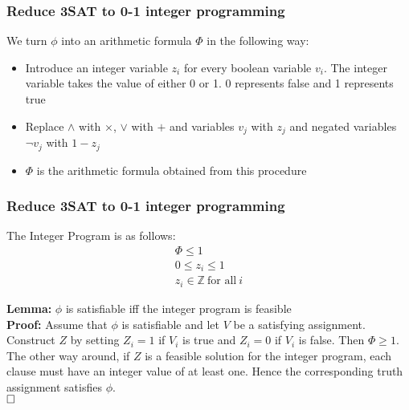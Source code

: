 \documentclass[mathserif]{beamer}
\renewcommand{\qed}{\hfill\square}
\begin{document}
\begin{frame}
\frametitle{Reduce 3SAT to 0-1 integer programming}
We turn $\phi$ into an arithmetic formula $\Phi$ in the following way:
\begin{itemize}
\item Introduce an integer variable $z_i$ for every boolean variable $v_i$. The
integer variable takes the value of either 0 or 1. 0 represents false and 1
represents true
\item Replace $\wedge$ with $\times$, $\vee$ with $+$ and variables $v_j$ with
	$z_j$ and negated variables $\neg v_j$ with $1 - z_j$
\item $\Phi$ is the arithmetic formula obtained from this procedure
\end{itemize}
\end{frame}

\begin{frame}
\frametitle{Reduce 3SAT to 0-1 integer programming}
The Integer Program is as follows:
\begin{align*}
\Phi \leq 1\\
0 \leq z_i \leq 1\\
z_i \in \mathbb{Z}\ \text{for all}\ i
\end{align*}

\textbf{Lemma:} $\phi$ is satisfiable iff the integer program is feasible\\
\textbf{Proof:} Assume that $\phi$ is satisfiable and let $V$ be a satisfying
assignment. Construct $Z$ by setting $Z_i = 1$ if $V_i$ is true and
$Z_i = 0$ if $V_i$ is false. Then $\Phi \geq 1$.\\
The other way around, if $Z$ is a feasible solution for the integer program,
each clause must have an integer value of at least one. Hence the corresponding
truth assignment satisfies $\phi$.\\
$\qed$
\end{frame}
\end{document}

